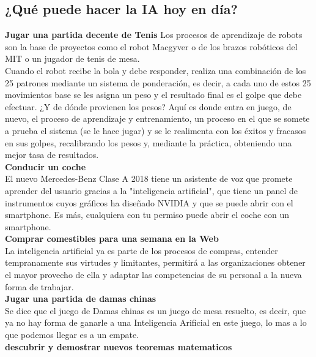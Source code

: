 \documentclass[12pt,a4paper]{report}
\begin{document}
\subsection*{¿Qué puede hacer la IA hoy en día?}
\textbf{Jugar una partida decente de Tenis}
Los procesos de aprendizaje de robots son la base de proyectos como el robot Macgyver o de los brazos robóticos del MIT o un jugador de tenis de mesa.\\
Cuando el robot recibe la bola y debe responder, realiza una combinación de los 25 patrones mediante un sistema de ponderación, es decir, a cada uno de estos 25 movimientos base se les asigna un peso y el resultado final es el golpe que debe efectuar. ¿Y de dónde provienen los pesos? Aquí es donde entra en juego, de nuevo, el proceso de aprendizaje y entrenamiento, un proceso en el que se somete a prueba el sistema (se le hace jugar) y se le realimenta con los éxitos y fracasos en sus golpes, recalibrando los pesos y, mediante la práctica, obteniendo una mejor tasa de resultados.
\\\textbf{Conducir un coche}\\
El nuevo Mercedes-Benz Clase A 2018 tiene un asistente de voz que promete aprender del usuario gracias a la "inteligencia artificial", que tiene un panel de instrumentos cuyos gráficos ha diseñado NVIDIA y que se puede abrir con el smartphone. Es más, cualquiera con tu permiso puede abrir el coche con un smartphone.
\\\textbf{Comprar comestibles para una semana en la Web}
\\La inteligencia artificial ya es parte de los procesos de compras, entender tempranamente sus virtudes y limitantes, permitirá a las organizaciones obtener el mayor provecho de ella y adaptar las competencias de su personal a la nueva forma de trabajar.\\\textbf{Jugar una partida de damas chinas} \\Se dice que el juego de Damas chinas es un juego de mesa resuelto, es decir, que ya no hay forma de ganarle a una Inteligencia Arificial en este juego, lo mas a lo que podemos llegar es a un empate. \\\textbf{descubrir y demostrar nuevos teoremas matematicos}
\end{document}
